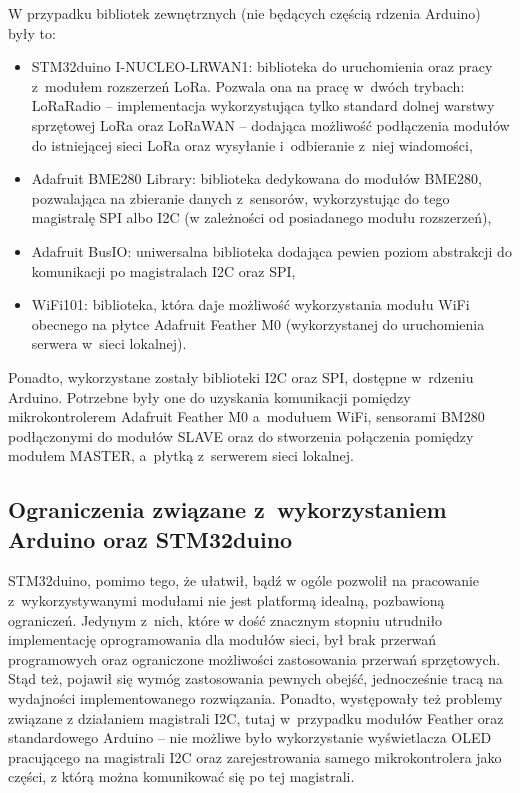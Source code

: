 W przypadku bibliotek zewnętrznych (nie będących częścią rdzenia Arduino) były to:
\begin{itemize}[label=--]
    \item STM32duino I-NUCLEO-LRWAN1: biblioteka do uruchomienia oraz pracy z~modułem rozszerzeń LoRa. Pozwala ona na
          pracę w~dwóch trybach: LoRaRadio -- implementacja wykorzystująca tylko standard dolnej warstwy sprzętowej LoRa
          oraz LoRaWAN -- dodająca możliwość podłączenia modułów do istniejącej sieci LoRa oraz wysyłanie i~odbieranie
          z~niej wiadomości,
    \item Adafruit BME280 Library: biblioteka dedykowana do modułów BME280, pozwalająca na zbieranie danych z~sensorów,
          wykorzystując do tego magistralę SPI albo I2C (w zależności od posiadanego modułu rozszerzeń),
    \item Adafruit BusIO: uniwersalna biblioteka dodająca pewien poziom abstrakcji do komunikacji po magistralach I2C
          oraz SPI,
    \item WiFi101: biblioteka, która daje możliwość wykorzystania modułu WiFi obecnego na płytce Adafruit Feather M0
          (wykorzystanej do uruchomienia serwera w~sieci lokalnej).
\end{itemize}
Ponadto, wykorzystane zostały biblioteki I2C oraz SPI, dostępne w~rdzeniu Arduino. Potrzebne były one do uzyskania
komunikacji pomiędzy mikrokontrolerem Adafruit Feather M0 a~modułuem WiFi, sensorami BM280 podłączonymi do modułów SLAVE
oraz do stworzenia połączenia pomiędzy modułem MASTER, a~płytką z~serwerem sieci lokalnej.

\subsection{Ograniczenia związane z~wykorzystaniem Arduino oraz STM32duino\label{sect:framework-limits}} STM32duino,
pomimo tego, że ułatwił, bądź w ogóle pozwolił na pracowanie z~wykorzystywanymi modułami nie jest platformą idealną,
pozbawioną ograniczeń. Jedynym z~nich, które w dość znacznym stopniu utrudniło implementację oprogramowania dla modułów
sieci, był brak przerwań programowych oraz ograniczone możliwości zastosowania przerwań sprzętowych. Stąd też, pojawił
się wymóg zastosowania pewnych obejść, jednocześnie tracą na wydajności implementowanego rozwiązania. Ponadto,
występowały też problemy związane z działaniem magistrali I2C, tutaj w~przypadku modułów Feather oraz standardowego
Arduino -- nie możliwe było wykorzystanie wyświetlacza OLED pracującego na magistrali I2C oraz zarejestrowania samego
mikrokontrolera jako części, z którą można komunikować się po tej magistrali.

